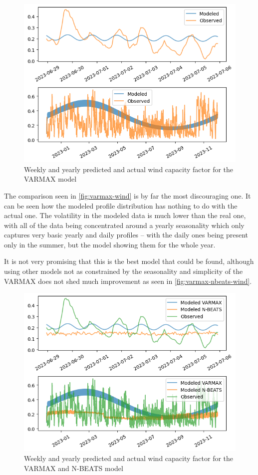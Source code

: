 \begin{figure}[ht]
    \centering
    \captionsetup{justification=centering}
    \includegraphics[width=0.7\linewidth]{assets/varmax-wind.png}
    \caption{Weekly and yearly predicted and actual wind capacity factor for the VARMAX model}
    \label{fig:varmax-wind}
\end{figure}
The comparison seen in \autoref{fig:varmax-wind} is by far the most discouraging one. It can be seen how the modeled profile distribution has nothing to do with the actual one. The volatility in the modeled data is much lower than the real one, with all of the data being concentrated around a yearly seasonality which only captures very basic yearly and daily profiles -- with the daily ones being present only in the summer, but the model showing them for the whole year. 

It is not very promising that this is the best model that could be found, although using other models not as constrained by the seasonality and simplicity of the VARMAX does not shed much improvement as seen in \autoref{fig:varmax-nbeats-wind}. 

\begin{figure}[ht]
    \centering
    \captionsetup{justification=centering}
    \includegraphics[width=0.7\linewidth]{assets/varmax-nbeats-wind.png}
    \caption{Weekly and yearly predicted and actual wind capacity factor for the VARMAX and N-BEATS model}
    \label{fig:varmax-nbeats-wind}
\end{figure}

